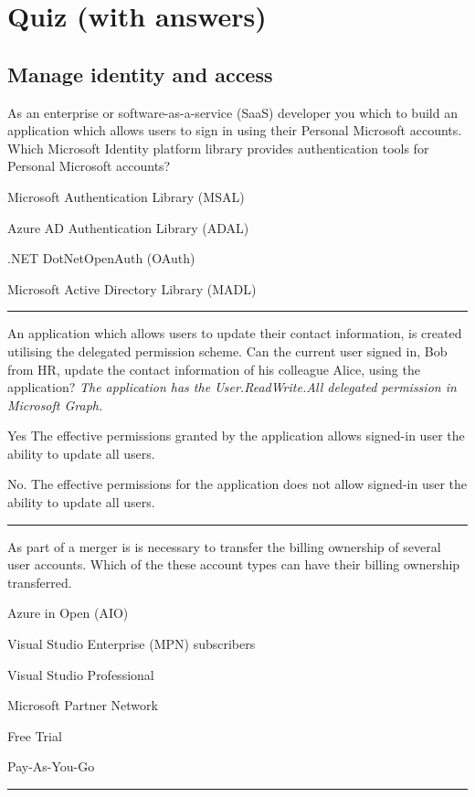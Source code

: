\section{Quiz (with answers)}
\subsection{Manage identity and access}
As an enterprise or software-as-a-service (SaaS) developer you which to build an application which allows users to sign in using their Personal Microsoft accounts. Which Microsoft Identity platform library provides authentication tools for Personal Microsoft accounts?
\begin{todolist}
\item[\correct] Microsoft Authentication Library (MSAL)
\item[\incorrect] Azure AD Authentication Library (ADAL)
\item[\incorrect] .NET DotNetOpenAuth (OAuth)
\item[\incorrect] Microsoft Active Directory Library (MADL)
\end{todolist}
\begin{center}\rule{6cm}{0.4pt}\end{center}
An application which allows users to update their contact information, is created utilising the delegated permission scheme. Can the current user signed in, Bob from HR, update the contact information of his colleague Alice, using the application? \textit{The application has the User.ReadWrite.All delegated permission in Microsoft Graph.}
\begin{todolist}
\item[\incorrect] Yes The effective permissions granted by the application allows signed-in user the ability to update all users. 
\item[\correct] No. The effective permissions for the application does not allow signed-in user the ability to update all users.
\end{todolist}
\begin{center}\rule{6cm}{0.4pt}\end{center}
As part of a merger is is necessary to transfer the billing ownership of several user accounts. Which of the these account types can have their billing ownership transferred.
\begin{todolist}
\item[\incorrect] Azure in Open (AIO)
\item[\correct] Visual Studio Enterprise (MPN) subscribers
\item[\correct] Visual Studio Professional
\item[\correct] Microsoft Partner Network
\item[\incorrect] Free Trial
\item[\correct] Pay-As-You-Go
\end{todolist}
\begin{center}\rule{6cm}{0.4pt}\end{center}